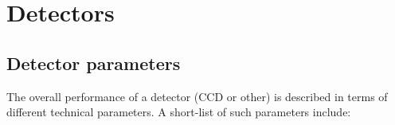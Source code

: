 %
\chapter{Detectors}

\section{Detector parameters}

The overall performance of a detector (CCD or other) is described in terms of
different technical parameters. A short-list of such parameters
include:

